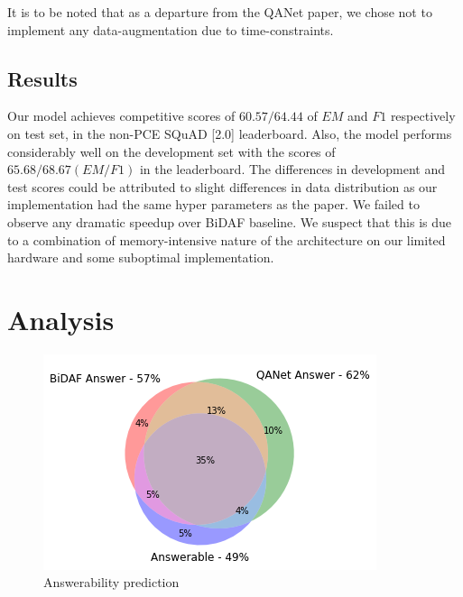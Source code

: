 \documentclass{article}
\begin{document}
It is to be noted that as a departure from the QANet paper, we chose not to implement any data-augmentation due to time-constraints.

\subsection{Results}
Our model achieves competitive scores of $60.57/64.44$ of $EM$ and $F1$ respectively on test set, in the non-PCE SQuAD [2.0] leaderboard. Also, the model performs considerably well on the development set with the scores of $65.68/68.67 (EM / F1)$ in the leaderboard. The differences in development and test scores could be attributed to slight differences in data distribution as our implementation had the same hyper parameters as the paper. We failed to observe any dramatic speedup over BiDAF baseline. We suspect that this is due to a combination of memory-intensive nature of the architecture on our limited hardware and some suboptimal implementation.  

\section{Analysis}

\begin{figure}
  \vspace{-10pt}
\centering
   \includegraphics[width=\linewidth]{../images/Answerable.png}
\caption{Answerability prediction}
\label{answerable-figure}
\end{figure}
\end{document}
